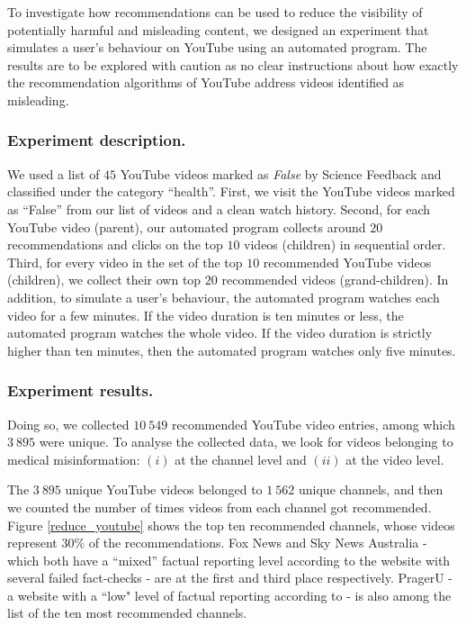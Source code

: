 \documentclass[Afour,sageh,times]{sagej}
\begin{document}
To investigate how recommendations can be used to reduce the visibility of potentially harmful and misleading content, we designed an experiment that simulates a user's behaviour on YouTube using an automated program. The results are to be explored with caution as no clear instructions about how exactly the recommendation algorithms of YouTube address videos identified as misleading. 
\subsubsection{Experiment description.} 
We used a list of $45$ YouTube videos marked as {\it False} by Science Feedback and classified under the category ``health''.
First, we visit the YouTube videos marked as ``False'' from our list of videos and a clean watch history.
Second, for each YouTube video (parent), our automated program collects around $20$ recommendations and clicks on the top $10$ videos (children) in sequential order. 
Third, for every video in the set of the top $10$ recommended YouTube videos (children), we collect their own top $20$ recommended videos (grand-children).
In addition, to simulate a user's behaviour, the automated program watches each video for a few minutes. If the video duration is ten minutes or less, the automated program watches the whole video. If the video duration is strictly higher than ten minutes, then the automated program watches only five minutes.
\subsubsection{Experiment results.} 
Doing so, we collected $10~549$ recommended YouTube video entries, among which $3~895$ were unique. 
To analyse the collected data, we look for videos belonging to medical misinformation: $(i)$ at the channel level and $(ii)$ at the video level. 

The $3~895$ unique YouTube videos belonged to $1~562$ unique channels, and then we counted the number of times videos from each channel got recommended.
Figure \ref{reduce_youtube} shows the top ten recommended channels, whose videos represent $30\%$ of the recommendations.
Fox News and Sky News Australia - which both have a ``mixed'' factual reporting level according to the website \cite{MBFCfoxnews} with several failed fact-checks - are at the first and third place respectively.
PragerU - a website with a ``low" level of factual reporting according to \cite{MBFCprageru} - is also among the list of the ten most recommended channels. 
\end{document}
